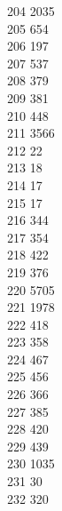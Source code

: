 { 204	2035 \\
 205	654 \\
 206	197 \\
 207	537 \\
 208	379 \\
 209	381 \\
 210	448 \\
 211	3566 \\
 212	22 \\
 213	18 \\
 214	17 \\
 215	17 \\
 216	344 \\
 217	354 \\
 218	422 \\
 219	376 \\
 220	5705 \\
 221	1978 \\
 222	418 \\
 223	358 \\
 224	467 \\
 225	456 \\
 226	366 \\
 227	385 \\
 228	420 \\
 229	439 \\
 230	1035 \\
 231	30 \\
 232	320 \\
}
